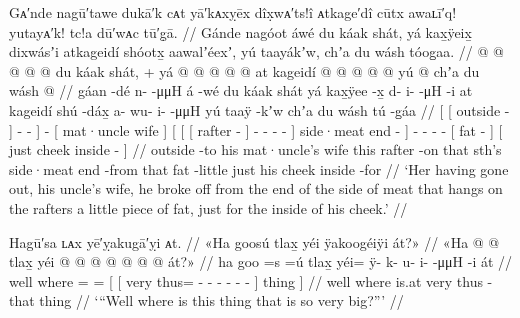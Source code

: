 \ex\label{ex:91-11-break-off-fatlet-for-cheek}%
%
\begingl
	\glpreamble	Gᴀ′nde nagū′tawe dukā′k cᴀt yā′kᴀxỵēx dîx̣wᴀ′ts!î ᴀtkage′dî cūtx
			awaʟī′q! yutayᴀ′k! tc!a dū′wᴀc tū′g̣ā. //
	\glpreamble	Gánde nagóot áwé du káak shát, yá kax̱ÿeix̱ dixwásʼi atkageidí shóotx̱
			aawalʼéexʼ, yú taayákʼw, chʼa du wásh tóog̱aa. //
	\gla	{} {}  @ {} {}  @ {} @ {} @ {} {}
		 @ {}
		{} du káak shát, {} +
		{} yá {} {}  @ {} {}
				 @ {} @ {} @ {} @ {} {}
			at kageidí  @ {} {}
		 @ {} @ {} @ {} @ {}
		{} yú  @ {} {}
		{} chʼa du wásh  @ {} {} //
	\glb	{} {} gáan -dé {} n-  -μμH {} {}
		á -wé
		{} du káak shát {}
		{} yá {} {} kax̱ÿee -x̱ {}
				d- i-  -μH -i {}
			at kageidí shú -dáx̱ {}
		a- wu- i-  -μμH
		{} yú taaÿ -kʼw {}
		{} chʼa du wásh tú -g̱áa {} //
	\glc	{}[ {}[ outside - {}]
			-  - \· {}]
		 -
		{}[  mat·uncle wife {}]
		{}[  {}[ {}[ rafter - {}]
				- -  - - {}]
			 side·meat end - {}]
		- - -  -
		{}[  fat - {}]
		{}[ just  cheek inside - {}] //
	\gld	{} {} outside -to {}  {} {} {} {}
		 {}
		{} his mat·uncle’s wife {}
		{} this {} {} rafter -on {}
			 {} {} {} \•that {}
			sth’s side·meat end -from {}
		 {} {} {} {}
		{} that fat -little {}
		{} just his cheek inside -for {} //
	\glft	‘Her having gone out, his uncle’s wife, he broke off from the end of
		the side of meat that hangs on the rafters a little piece of fat,
		just for the inside of his cheek.’
		//
\endgl
\xe

\ex\label{ex:91-12-where-is-this-big-thing}%
%
\begingl
	\glpreamble	Hagū′sa ʟᴀx yē′ỵakugā′ỵi ᴀt. //
	\glpreamble	«\!Ha goosú tlax̱ yéi ÿakoogéiÿi át?\!» //
	\gla	«\!Ha  @ {} @ {} {} {} tlax̱ yéi @  @ {} @ {} @ {} @ {} @ {} @ {} {} át?\!» {} //
	\glb	\pqp{}ha goo =s =ú {} {} tlax̱ yéi= ÿ- k- u- i-  -μμH -i {} át {} //
	\glc	\pqp{}well where = = {}[ {}[ very thus= - -
			- -  - - {}] thing {}] //
	\gld	\pqp{}well where \• \•is.at {} {} very thus
			 {} {} {} {} {} -that {} thing {} //
	\glft	‘“Well where is this thing that is so very big?”’
		//
\endgl
\xe

